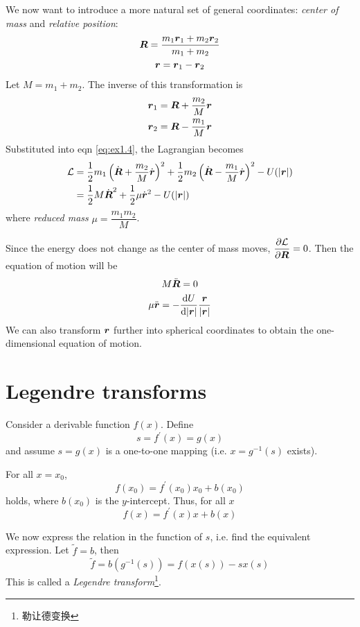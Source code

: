 We now want to introduce a more natural set of general coordinates: \textit{center of mass} and \textit{relative position}:
\begin{gather*}
	\boldsymbol{R}=\dfrac{m_1\boldsymbol{r}_1+m_2\boldsymbol{r}_2}{m_1+m_2}\\
	\boldsymbol{r}=\boldsymbol{r}_1-\boldsymbol{r}_2
\end{gather*}
Let $M=m_1+m_2$. The inverse of this transformation is
\begin{gather*}
	\boldsymbol{r}_1=\boldsymbol{R}+\dfrac{m_2}{M}\boldsymbol{r}\\
	\boldsymbol{r}_2=\boldsymbol{R}-\dfrac{m_1}{M}\boldsymbol{r}
\end{gather*}
Substituted into eqn \ref{eq:ex1.4}, the Lagrangian becomes
\begin{align*}
	\mathcal{L}&=
	\dfrac{1}{2} 
	m_1\left(\dot{\boldsymbol{R}}+\dfrac{m_2}{M}\dot{\boldsymbol{r}}\right)^2+
	\dfrac{1}{2} m_2\left(\dot{\boldsymbol{R}}-\dfrac{m_1}{M}\dot{\boldsymbol{r}}\right)^2-U(|\boldsymbol{r}|)\\
	&=\dfrac{1}{2} M\dot{\boldsymbol{R}}^2+\dfrac{1}{2}\mu\dot{\boldsymbol{r}}^2-U(|\boldsymbol{r}|)
\end{align*}
where \textit{reduced mass} $\mu=\dfrac{m_1m_2}{M}$.

Since the energy does not change as the center of mass moves, $\dfrac{\partial \mathcal{L}}{\partial \boldsymbol{R}}=0$. Then the equation of motion will be
\begin{gather*}
	M\ddot{\boldsymbol{R}}=0\\
	\mu\ddot{\boldsymbol{r}}=-\dfrac{\mathrm{d} U}{\mathrm{d} |\boldsymbol{r}|}\dfrac{\boldsymbol{r}}{|\boldsymbol{r}|}
\end{gather*}
We can also transform $\boldsymbol{r}$ further into spherical coordinates to obtain the one-dimensional equation of motion.

\section{Legendre transforms}

Consider a derivable function $f(x)$. Define
\begin{equation}
	s=f^\prime(x)=g(x)
\end{equation}
and assume $s=g(x)$ is a one-to-one mapping (i.e. $x=g^{-1}(s)$ exists).

For all $x=x_0$, 
\begin{equation*}
	f(x_0)=f^\prime(x_0)x_0+b(x_0)
\end{equation*}
holds, where $b(x_0)$ is the $y$-intercept. Thus, for all $x$
\begin{equation}
	f(x)=f^\prime(x)x+b(x)
\end{equation}

We now express the relation in the function of $s$, i.e. find the equivalent expression. Let $\tilde{f}=b$, then
\begin{equation}
	\tilde{f}=b(g^{-1}(s))=f(x(s))-sx(s)
\end{equation}
This is called a \textit{Legendre transform}\footnote{勒让德变换}.

